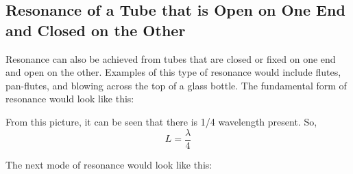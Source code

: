	

		\subsection{Resonance of a Tube that is Open on One End and Closed on the Other}
	
	Resonance can also be achieved from tubes that are closed or fixed on one end and open on the other.  Examples of this type of resonance would include flutes, pan-flutes, and blowing across the top of a glass bottle.  The fundamental form of resonance would look like this:
	
	
	
	From this picture, it can be seen that there is 1/4 wavelength present.  So, 
	\begin{equation}
		L = \frac{\lambda}{4}
	\end{equation}
	
	The next mode of resonance would look like this:
	
